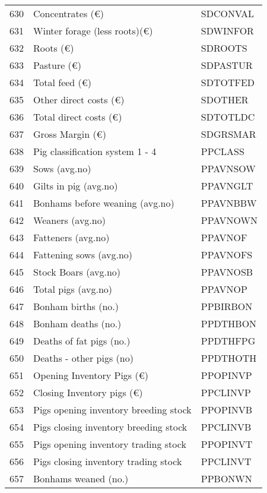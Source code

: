 \documentclass{article}\usepackage{graphicx, color}
\begin{document}
\begin{flushleft}
\begin{table}[ht]
\begin{center}
\begin{tabular}{rll}
  630 & Concentrates              (€) & SDCONVAL \\ 
  631 & Winter forage (less roots)(€) & SDWINFOR \\ 
  632 & Roots                     (€) & SDROOTS \\ 
  633 & Pasture                   (€) & SDPASTUR \\ 
  634 & Total feed                (€) & SDTOTFED \\ 
  635 & Other direct costs        (€) & SDOTHER \\ 
  636 & Total direct costs        (€) & SDTOTLDC \\ 
  637 & Gross Margin              (€) & SDGRSMAR \\ 
  638 & Pig classification system  1 - 4 & PPCLASS \\ 
  639 & Sows                (avg.no) & PPAVNSOW \\ 
  640 & Gilts in pig        (avg.no) & PPAVNGLT \\ 
  641 & Bonhams before weaning (avg.no) & PPAVNBBW \\ 
  642 & Weaners             (avg.no) & PPAVNOWN \\ 
  643 & Fatteners           (avg.no) & PPAVNOF \\ 
  644 & Fattening sows      (avg.no) & PPAVNOFS \\ 
  645 & Stock Boars         (avg.no) & PPAVNOSB \\ 
  646 & Total pigs          (avg.no) & PPAVNOP \\ 
  647 & Bonham births           (no.) & PPBIRBON \\ 
  648 & Bonham deaths           (no.) & PPDTHBON \\ 
  649 & Deaths of fat pigs      (no.) & PPDTHFPG \\ 
  650 & Deaths - other pigs        (no) & PPDTHOTH \\ 
  651 & Opening Inventory Pigs   (€) & PPOPINVP \\ 
  652 & Closing Inventory pigs   (€) & PPCLINVP \\ 
  653 & Pigs opening inventory breeding stock & PPOPINVB \\ 
  654 & Pigs closing inventory breeding stock & PPCLINVB \\ 
  655 & Pigs opening inventory trading stock & PPOPINVT \\ 
  656 & Pigs closing inventory trading stock & PPCLINVT \\ 
  657 & Bonhams weaned          (no.) & PPBONWN \\ 

\end{tabular}
\end{center}
\end{table}
\end{flushleft}
\end{document}

